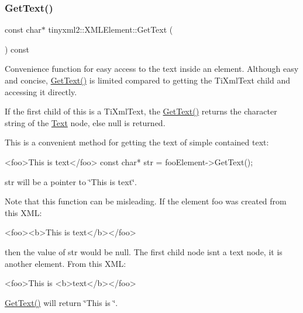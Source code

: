\subsubsection{\texorpdfstring{Get\+Text()}{GetText()}\hspace{0.1cm}{\footnotesize\ttfamily [2/2]}}
{\footnotesize\ttfamily const char$\ast$ tinyxml2\+::\+X\+M\+L\+Element\+::\+Get\+Text (\begin{DoxyParamCaption}{ }\end{DoxyParamCaption}) const}

Convenience function for easy access to the text inside an element. Although easy and concise, \hyperlink{classtinyxml2_1_1XMLElement_a0fa5bea0a4daf3ddd503dcabb823eba6}{Get\+Text()} is limited compared to getting the Ti\+Xml\+Text child and accessing it directly.

If the first child of \textquotesingle{}this\textquotesingle{} is a Ti\+Xml\+Text, the \hyperlink{classtinyxml2_1_1XMLElement_a0fa5bea0a4daf3ddd503dcabb823eba6}{Get\+Text()} returns the character string of the \hyperlink{classText}{Text} node, else null is returned.

This is a convenient method for getting the text of simple contained text\+: \begin{DoxyVerb}<foo>This is text</foo>
    const char* str = fooElement->GetText();
\end{DoxyVerb}


\textquotesingle{}str\textquotesingle{} will be a pointer to \char`\"{}\+This is text\char`\"{}.

Note that this function can be misleading. If the element foo was created from this X\+ML\+: \begin{DoxyVerb}    <foo><b>This is text</b></foo>
\end{DoxyVerb}


then the value of str would be null. The first child node isn\textquotesingle{}t a text node, it is another element. From this X\+ML\+: \begin{DoxyVerb}    <foo>This is <b>text</b></foo>
\end{DoxyVerb}
 \hyperlink{classtinyxml2_1_1XMLElement_a0fa5bea0a4daf3ddd503dcabb823eba6}{Get\+Text()} will return \char`\"{}\+This is \char`\"{}. \mbox{\label{classtinyxml2_1_1XMLElement_acfaaeeadf0b0dbe56bb0f5ec12cb7736}} 
